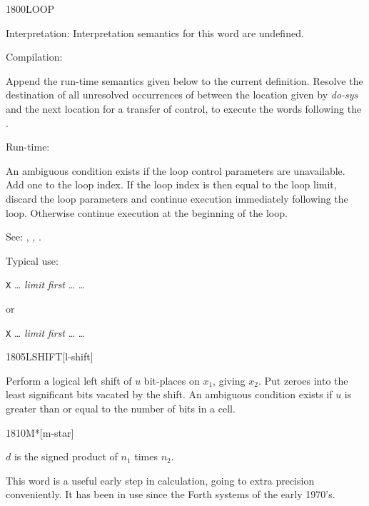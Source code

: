 \begin{newword*}{1800}{LOOP}
\item[Interpretation:]
	Interpretation semantics for this word are undefined.

\item[Compilation:]

	Append the run-time semantics given below to the current
	definition. Resolve the destination of all unresolved
	occurrences of  between the location given by
	\emph{do-sys} and the next location for a transfer of control,
	to execute the words following the .

\item[Run-time:]
	\stack{}{}

	An ambiguous condition exists if the loop control parameters
	are unavailable. Add one to the loop index. If the loop index
	is then equal to the loop limit, discard the loop parameters
	and continue execution immediately following the loop. Otherwise
	continue execution at the beginning of the loop.

\item[See:]
	,
	,
	.

	\begin{rationale} %
		Typical use:

		\tab \word{:} \texttt{X} {\ldots}
			\emph{limit} \emph{first} 
				{\ldots}
		{\ldots} \word{;}

		or

		\tab \word{:} \texttt{X} {\ldots}
			\emph{limit} \emph{first} 
				{\ldots}
		{\ldots} \word{;}
	\end{rationale}
\end{newword*}


\begin{newword}{1805}{LSHIFT}[l-shift]

	Perform a logical left shift of $u$ bit-places on $x_1$, giving
	$x_2$. Put zeroes into the least significant bits vacated by the
	shift. An ambiguous condition exists if $u$ is greater than or
	equal to the number of bits in a cell.
\end{newword}


\begin{newword}{1810}{M*}[m-star]

	$d$ is the signed product of $n_1$ times $n_2$.

	\begin{rationale} %
		This word is a useful early step in calculation, going to
		extra precision conveniently. It has been in use since the
		Forth systems of the early 1970's.
	\end{rationale}
\end{newword}


